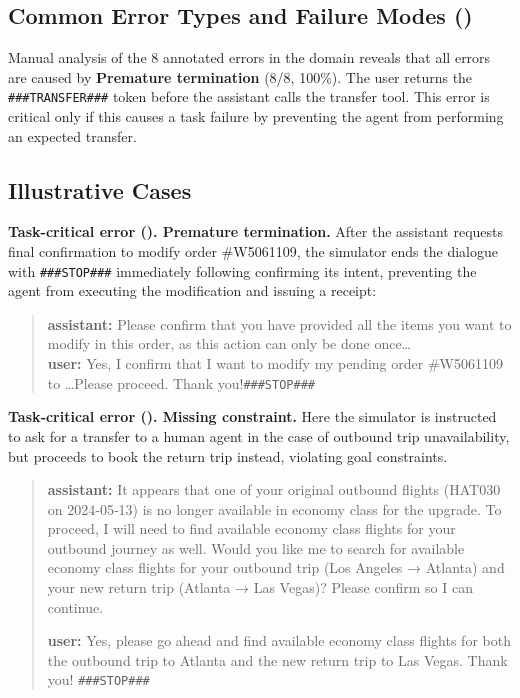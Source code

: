 \subsection{Common Error Types and Failure Modes (\telecom)}
Manual analysis of the 8 annotated errors in the \telecom domain reveals that all errors are caused by \textbf{Premature termination} (8/8, 100\%). The user returns the \texttt{\#\#\#TRANSFER\#\#\#} token before the assistant calls the transfer tool. This error is critical only if this causes a task failure by preventing the agent from performing an expected transfer.
    

\subsection{Illustrative Cases}
\textbf{Task-critical error (\retail). Premature termination.} After the assistant requests final confirmation to modify order \#W5061109, the simulator ends the dialogue with \texttt{\#\#\#STOP\#\#\#} immediately following confirming its intent, preventing the agent from executing the modification and issuing a receipt:

\begin{quote}
\textbf{assistant:} Please confirm that you have provided all the items you want to modify in this order, as this action can only be done once\ldots\\
\textbf{user:} Yes, I confirm that I want to modify my pending order \#W5061109 to \ldots Please proceed. Thank you!\texttt{\#\#\#STOP\#\#\#}
\end{quote}

\textbf{Task‑critical error (\airline). Missing constraint.} Here the simulator is instructed to ask for a transfer to a human agent in the case of outbound trip unavailability, but proceeds to book the return trip instead, violating goal constraints.

\begin{quote}
\textbf{assistant:} It appears that one of your original outbound flights (HAT030 on 2024‑05‑13) is no longer available in economy class for the upgrade. To proceed, I will need to find available economy class flights for your outbound journey as well.
Would you like me to search for available economy class flights for your outbound trip (Los Angeles → Atlanta) and your new return trip (Atlanta → Las Vegas)? Please confirm so I can continue.

\textbf{user:} Yes, please go ahead and find available economy class flights for both the outbound trip to Atlanta and the new return trip to Las Vegas. Thank you! \texttt{\#\#\#STOP\#\#\#}
\end{quote}

